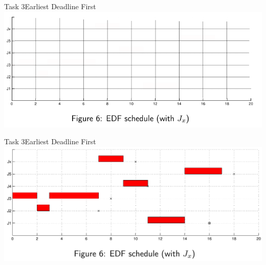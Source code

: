 \begin{frame}{Task 3}{Earliest Deadline First}
  \includegraphics[width=\textwidth]{./figures/3_empty_2.png}
\end{frame}

\begin{frame}{Task 3}{Earliest Deadline First}
  \includegraphics[width=\textwidth]{./figures/3_sol_2.png}
\end{frame}
